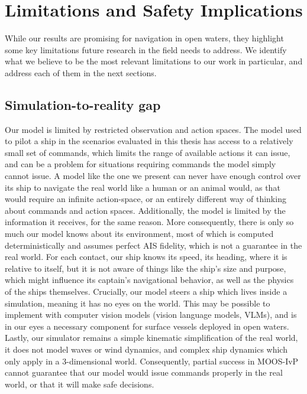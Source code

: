 \documentclass[10pt]{reportMaster}
\begin{document}
\section{Limitations and Safety Implications}

While our results are promising for navigation in open waters, they highlight some key limitations future research in the field needs to address. We identify what we believe to be the most relevant limitations to our work in particular, and address each of them in the next sections.

\subsection{Simulation-to-reality gap}

Our model is limited by restricted observation and action spaces. The model used to pilot a ship in the scenarios evaluated in this thesis has access to a relatively small set of commands, which limits the range of available actions it can issue, and can be a problem for situations requiring commands the model simply cannot issue. A model like the one we present can never have enough control over its ship to navigate the real world like a human or an animal would, as that would require an infinite action-space, or an entirely different way of thinking about commands and action spaces. Additionally, the model is limited by the information it receives, for the same reason. More consequently, there is only so much our model knows about its environment, most of which is computed deterministically and assumes perfect AIS fidelity, which is not a guarantee in the real world. For each contact, our ship knows its speed, its heading, where it is relative to itself, but it is not aware of things like the ship's size and purpose, which might influence its captain's navigational behavior, as well as the physics of the ships themselves. Crucially, our model steers a ship which lives inside a simulation, meaning it has no eyes on the world. This may be possible to implement with computer vision models (vision language models, VLMs), and is in our eyes a necessary component for surface vessels deployed in open waters. Lastly, our simulator remains a simple kinematic simplification of the real world, it does not model waves or wind dynamics, and complex ship dynamics which only apply in a 3-dimensional world. Consequently, partial success in MOOS-IvP cannot guarantee that our model would issue commands properly in the real world, or that it will make safe decisions. 
\end{document}
